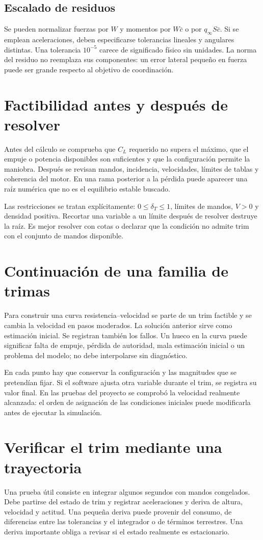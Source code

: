 \subsection{Escalado de residuos}
Se pueden normalizar fuerzas por $W$ y momentos por $W\bar c$ o por $q_\infty S\bar c$. Si se emplean aceleraciones, deben especificarse tolerancias lineales y angulares distintas. Una tolerancia $10^{-5}$ carece de significado físico sin unidades. La norma del residuo no reemplaza sus componentes: un error lateral pequeño en fuerza puede ser grande respecto al objetivo de coordinación.

\section{Factibilidad antes y después de resolver}
Antes del cálculo se comprueba que $C_L$ requerido no supera el máximo, que el empuje o potencia disponibles son suficientes y que la configuración permite la maniobra. Después se revisan mandos, incidencia, velocidades, límites de tablas y coherencia del motor. En una rama posterior a la pérdida puede aparecer una raíz numérica que no es el equilibrio estable buscado.

Las restricciones se tratan explícitamente: $0\leq\delta_T\leq1$, límites de mandos, $V>0$ y densidad positiva. Recortar una variable a un límite después de resolver destruye la raíz. Es mejor resolver con cotas o declarar que la condición no admite trim con el conjunto de mandos disponible.

\section{Continuación de una familia de trimas}
Para construir una curva resistencia--velocidad se parte de un trim factible y se cambia la velocidad en pasos moderados. La solución anterior sirve como estimación inicial. Se registran también los fallos. Un hueco en la curva puede significar falta de empuje, pérdida de autoridad, mala estimación inicial o un problema del modelo; no debe interpolarse sin diagnóstico.

En cada punto hay que conservar la configuración y las magnitudes que se pretendían fijar. Si el software ajusta otra variable durante el trim, se registra su valor final. En las pruebas del proyecto se comprobó la velocidad realmente alcanzada: el orden de asignación de las condiciones iniciales puede modificarla antes de ejecutar la simulación.

\section{Verificar el trim mediante una trayectoria}
Una prueba útil consiste en integrar algunos segundos con mandos congelados. Debe partirse del estado de trim y registrar aceleraciones y deriva de altura, velocidad y actitud. Una pequeña deriva puede provenir del consumo, de diferencias entre las tolerancias y el integrador o de términos terrestres. Una deriva importante obliga a revisar si el estado realmente es estacionario.

